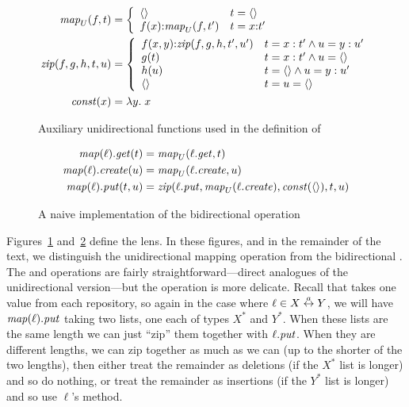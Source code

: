 \begin{figure}
    \begin{align*}
        \mathit{map}_U(f,t) &= \left\{\begin{array}{ll}
            \left<\right> & t = \left<\right> \\
            f(x) \mathord{:} \mathit{map}_U(f,t') & t = x \mathord{:} t'
        \end{array}\right. \\
        \mathit{zip}(f,g,h,t,u) &= \left\{\begin{array}{ll}
            f(x,y) \mathord{:} \mathit{zip}(f,g,h,t',u') & t = x:t' \land u = y:u' \\
            g(t) & t = x:t' \land u = \left<\right> \\
            h(u) & t = \left<\right> \land u = y:u' \\
            \left<\right> & t = u = \left<\right>
        \end{array}\right. \\
        \mathit{const}(x) &= \lambda y.\;x
    \end{align*}
    \caption{Auxiliary unidirectional functions used in the definition of \map}
    \label{fig:uni-map-zip-const}
\end{figure}
\begin{figure}
    \begin{align*}
        \mathit{map}(\ell).\mathit{get}(t) &= \mathit{map}_U(\ell.\mathit{get},t) \\
        \mathit{map}(\ell).\mathit{create}(u) &= \mathit{map}_U(\ell.\mathit{create},u) \\
        \mathit{map}(\ell).\mathit{put}(t,u) &=
            \mathit{zip}(\ell.\mathit{put},\mathit{map}_U(\ell.\mathit{create}),\mathit{const}(\left<\right>),t,u)
    \end{align*}
    \caption{A naive implementation of the bidirectional \map operation}
    \label{fig:naive-asymmetric-map}
\end{figure}
Figures~\ref{fig:uni-map-zip-const} and~\ref{fig:naive-asymmetric-map}
define the \map lens. In these figures, and in the remainder of the text, we
distinguish the unidirectional mapping operation \mapU from the
bidirectional \map.  The \GET and \CREATE operations are fairly
straightforward---direct analogues of the unidirectional version---but the
\PUT operation is more delicate. Recall that \PUT takes one value from each
repository, so again in the case where $\ell \in X \overset{a}{\leftrightarrow} Y$, we will have
$\mathit{map}(\ell).\mathit{put}$ taking two lists, one each of types $X^*$ and $Y^*$.
When these lists are the same length we can just ``zip'' them together with
$\ell.\mathit{put}$. When they are different lengths, we can zip together as much
as we can (up to the shorter of the two lengths), then either treat the
remainder as deletions (if the $X^*$ list is longer) and so do nothing, or
treat the remainder as insertions (if the $Y^*$ list is longer) and so use
$\ell$'s \CREATE method.

